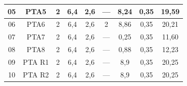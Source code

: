 \documentclass[	DIV=calc,%
							paper=a4,%
							fontsize=12pt,%
							onecolumn]{scrartcl}	 					%
\begin{document}
\begin{tabular}{|c|c|c|c|c|c|c|c|c|}
	05                 & PTA5               & 2                                                    & 6,4                                         & 2,6                                           & ---                                           & 8,24                                             & 0,35                                            & 19,59                                                             \\ \hline
	06                 & PTA6               & 2                                                    & 6,4                                         & 2,6                                           & 2                                             & 8,86                                             & 0,35                                            & 20,21                                                             \\ \hline
	07                 & PTA7               & 2                                                    & 6,4                                         & 2,6                                           & ---                                           & 0,25                                             & 0,35                                            & 11,60                                                             \\ \hline
	08                 & PTA8               & 2                                                    & 6,4                                         & 2,6                                           & ---                                           & 0,88                                             & 0,35                                            & 12,23                                                             \\ \hline
	09                 & PTA R1             & 2                                                    & 6,4                                         & 2,6                                           & ---                                           & 8,9                                              & 0,35                                            & 20,25                                                             \\ \hline
	10                 & PTA R2             & 2                                                    & 6,4                                         & 2,6                                           & ---                                           & 8,9                                              & 0,35                                            & 20,25                                                             \\ \hline

\end{tabular}
\end{document}
